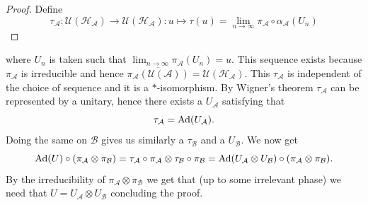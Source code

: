 \documentclass[12pt,a4paper,twoside]{article}
\let\originalleft\left
\let\originalright\right
\renewcommand{\left}{\mathopen{}\mathclose\bgroup\originalleft}
\renewcommand{\right}{\aftergroup\egroup\originalright}
\newcommand{\UU}{\mathcal U}
\newcommand{\BB}{\mathcal B}
\newcommand{\HH}{\mathcal H}
\renewcommand{\AA}{\mathcal A}
\newcommand{\Ad}[1]{\textrm{Ad}\left(#1\right)}
\theoremstyle{definition}
\numberwithin{equation}{section}
\begin{document}
\begin{proof}
	Define
	\[\tau_\AA:\UU(\HH_\AA)\rightarrow\UU(\HH_\AA):u\mapsto \tau(u)=\lim_{n\rightarrow\infty}\pi_\AA\circ\alpha_\AA(U_n) \]
\end{proof}
where $U_n$ is taken such that $\lim_{n\rightarrow\infty}\pi_\AA(U_n)=u$. This sequence exists because $\pi_\AA$ is irreducible and hence $\overline{\pi_\AA(\UU(\AA))}=\UU(\HH_\AA)$. This $\tau_\AA$ is independent of the choice of sequence and it is a $*$-isomorphism. By Wigner's theorem $\tau_\AA$ can be represented by a unitary, hence there exists a $U_\AA$ satisfying that
\begin{equation}
	\tau_\AA=\Ad{U_\AA}.
\end{equation}
Doing the same on $\BB$ gives us similarly a $\tau_\BB$ and a $U_\BB$. We now get
\begin{equation}
	\Ad{U}\circ(\pi_\AA\otimes\pi_\BB)=\tau_\AA\circ\pi_\AA\otimes\tau_\BB\circ\pi_\BB=\Ad{U_\AA\otimes U_\BB}\circ(\pi_\AA\otimes\pi_\BB).
\end{equation}
By the irreducibility of $\pi_\AA\otimes\pi_\BB$ we get that (up to some irrelevant phase) we need that $U=U_\AA\otimes U_\BB$ concluding the proof.
\end{document}
